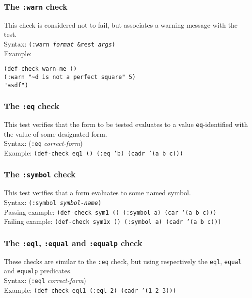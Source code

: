 \subsubsection{The \texttt{:warn} check} 
This check is considered not to fail, but associates a warning message
with the test.
\\ Syntax: \texttt{(:warn \emph{format} \&rest \emph{args})}
\\ Example:
\begin{tabbing}
\texttt{(de}\=\texttt{f-}\=\texttt{check warn-me ()}
\\ \>\>\texttt{(:warn "\~{}d is not a perfect square" 5)}
\\ \>\texttt{"asdf")}
\end{tabbing}

\subsubsection{The \texttt{:eq} check} 
This test verifies that the form to be tested evaluates to a value
\texttt{eq}-identified with the value of some designated
form.
\\ Syntax: (\texttt{:eq} \textit{correct-form})
\\ Example: \texttt{(def-check eq1 () (:eq 'b) (cadr '(a b c)))}

\subsubsection{The \texttt{:symbol} check} 
This test verifies that a form evaluates to some named
symbol.
\\ Syntax: \texttt{(:symbol \emph{symbol-name})}
\\ Passing example: \texttt{(def-check sym1  () (:symbol a) (car '(a b c)))}
\\ Failing example: \texttt{(def-check sym1x () (:symbol a) (cadr '(a b c)))}

\subsubsection{The \texttt{:eql}, \texttt{:equal} and \texttt{:equalp} check} 
These checks are similar to the \texttt{:eq} check, but using
respectively the \texttt{eql}, \texttt{equal} and \texttt{equalp}
predicates.
\\ Syntax: (\texttt{:eql} \textit{correct-form})
\\ Example: \texttt{(def-check eql1 (:eql 2) (cadr '(1 2 3)))}

